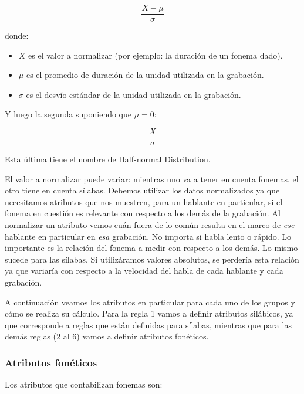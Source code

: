 \hspace{2cm} \[\frac{ X - \mu }{ \sigma }\]

\noindent donde:

\begin{itemize}
	\item $X$ es el valor a normalizar (por ejemplo: la duración de un fonema dado).
	\item $\mu$ es el promedio de duración de la unidad utilizada en la grabación.
	\item $\sigma$ es el desvío estándar de la unidad utilizada en la grabación.
\end{itemize}

\noindent Y luego la segunda suponiendo que $\mu = 0$:

\hspace{2cm} \[\frac{ X }{ \sigma }\]

\noindent Esta última tiene el nombre de Half-normal Distribution.

El valor a normalizar puede variar: mientras uno va a tener en cuenta fonemas, el otro tiene en cuenta sílabas. Debemos utilizar los datos normalizados ya que necesitamos atributos que nos muestren, para un hablante en particular, si el fonema en cuestión es relevante con respecto a los demás de la grabación. Al normalizar un atributo vemos cuán fuera de lo común resulta en el marco de \textit{ese} hablante en particular en \textit{esa} grabación. No importa si habla lento o rápido. Lo importante es la relación del fonema a medir con respecto a los demás. Lo mismo sucede para las sílabas. Si utilizáramos valores absolutos, se perdería esta relación ya que variaría con respecto a la velocidad del habla de cada hablante y cada grabación.
 
A continuación veamos los atributos en particular para cada uno de los grupos y cómo se realiza su cálculo. Para la regla 1 vamos a definir atributos silábicos, ya que corresponde a reglas que están definidas para sílabas, mientras que para las demás reglas (2 al 6) vamos a definir atributos fonéticos.

\subsubsection{Atributos fonéticos}

Los atributos que contabilizan fonemas son:

